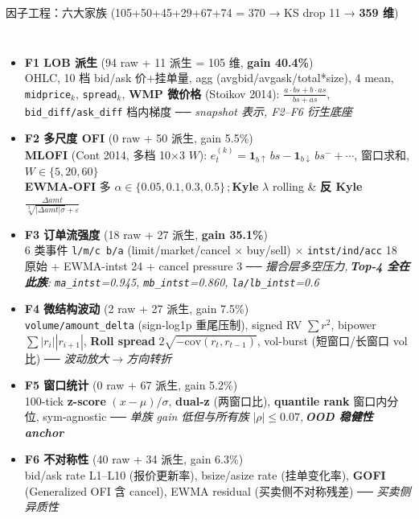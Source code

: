 \documentclass[aspectratio=169,11pt]{beamer}
\newcommand{\hl}[1]{\textcolor{lblue}{\textbf{#1}}}
\newcommand{\rhl}[1]{\textcolor{accred}{\textbf{#1}}}
\begin{document}
\begin{frame}{因子工程：六大家族 (105+50+45+29+67+74 = 370 → KS drop 11 → \hl{359 维})}
  \vspace{2pt}
  \begin{columns}[T,onlytextwidth]
    \vspace{6pt}
    \tiny
    \begin{itemize}\setlength{\itemsep}{2pt}\setlength{\topsep}{0pt}\setlength{\parsep}{0pt}
      \item \hl{F1 LOB 派生} (94 raw + 11 派生 = 105 维, \rhl{gain 40.4\%})\\
        OHLC, 10 档 bid/ask 价+挂单量, agg (avgbid/avgask/total*size), 4 mean, \texttt{midprice$_k$}, \texttt{spread$_k$}, \textbf{WMP 微价格} (Stoikov 2014): $\frac{a\cdot bs + b\cdot as}{bs+as}$, \texttt{bid\_diff/ask\_diff} 档内梯度 ── \emph{snapshot 表示, F2--F6 衍生底座}
      \item \hl{F2 多尺度 OFI} (0 raw + 50 派生, gain 5.5\%)\\
        \textbf{MLOFI} (Cont 2014, 多档 10$\times$3 $W$): $e_t^{(k)} = \mathbf{1}_{b\uparrow}\,bs - \mathbf{1}_{b\downarrow}\,bs^{-} + \cdots$, 窗口求和, $W\in\{5,20,60\}$ \\
        \textbf{EWMA-OFI} 多 $\alpha\in\{0.05,0.1,0.3,0.5\}$\,;\,\textbf{Kyle} $\lambda$ rolling \& \textbf{反 Kyle}\,$\frac{\Delta amt}{\sqrt[3]{|\Delta amt|\sigma}+\varepsilon}$
      \item \hl{F3 订单流强度} (18 raw + 27 派生, \rhl{gain 35.1\%})\\
        6 类事件 \texttt{l/m/c b/a} (limit/market/cancel × buy/sell) × \texttt{intst/ind/acc} 18 原始 + EWMA-intst 24 + cancel pressure 3 ── \emph{撮合层多空压力,\,\rhl{Top-4 全在此族}: \texttt{ma\_intst}=0.945, \texttt{mb\_intst}=0.860, \texttt{la/lb\_intst}=0.6}
      \item \hl{F4 微结构波动} (2 raw + 27 派生, gain 7.5\%)\\
        \texttt{volume/amount\_delta} (sign-log1p 重尾压制), signed RV $\sum r^2$, bipower $\sum|r_i||r_{i+1}|$, \textbf{Roll spread} $2\sqrt{-\text{cov}(r_t, r_{t-1})}$, vol-burst (短窗口/长窗口 vol 比) ── \emph{波动放大$\to$方向转折}
      \item \hl{F5 窗口统计} (0 raw + 67 派生, gain 5.2\%)\\
        100-tick \textbf{z-score} $(x-\mu)/\sigma$, \textbf{dual-z} (两窗口比), \textbf{quantile rank} 窗口内分位, sym-agnostic ── \emph{单族 gain 低但与所有族 $|\rho|{\le}0.07$,\,\rhl{OOD 稳健性 anchor}}
      \item \hl{F6 不对称性} (40 raw + 34 派生, gain 6.3\%)\\
        bid/ask rate L1--L10 (报价更新率), bsize/asize rate (挂单变化率), \textbf{GOFI} (Generalized OFI 含 cancel), EWMA residual (买卖侧不对称残差) ── \emph{买卖侧异质性}
    \end{itemize}


\end{columns}
\end{frame}
\end{document}
